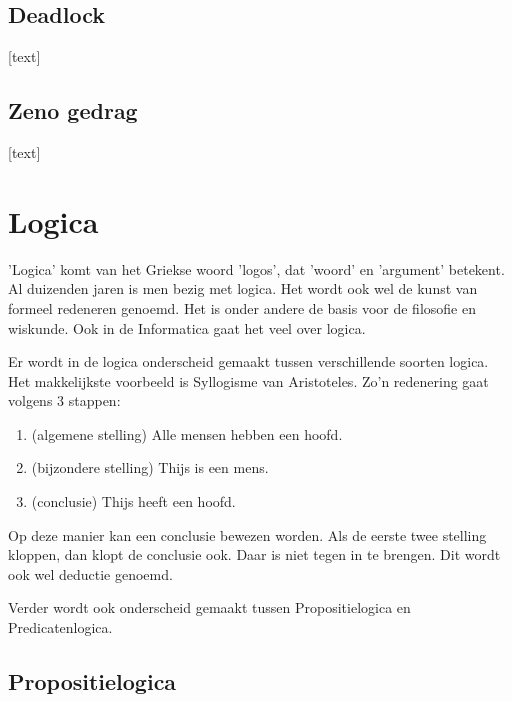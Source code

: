\documentclass{article}
\begin{document}
		\subsection{Deadlock}
		
		[text]
		
		\subsection{Zeno gedrag}
		
		[text]
		
	\newpage
	
	
	\section{Logica}
	
	'Logica' komt van het Griekse woord 'logos', dat 'woord' en 'argument' betekent. Al duizenden jaren is men bezig met logica. Het wordt ook wel de kunst van formeel redeneren genoemd. Het is onder andere de basis voor de filosofie en wiskunde. Ook in de Informatica gaat het veel over logica.

	Er wordt in de logica onderscheid gemaakt tussen verschillende soorten logica. Het makkelijkste voorbeeld is Syllogisme van Aristoteles. Zo'n redenering gaat volgens 3 stappen:

	\begin{enumerate}
		\item (algemene stelling) Alle mensen hebben een hoofd.
		\item (bijzondere stelling) Thijs is een mens.
		\item (conclusie) Thijs heeft een hoofd.
	\end{enumerate}

	Op deze manier kan een conclusie bewezen worden. Als de eerste twee stelling kloppen, dan klopt de conclusie ook. Daar is niet tegen in te brengen. Dit wordt ook wel deductie genoemd.

	Verder wordt ook onderscheid gemaakt tussen Propositielogica en Predicatenlogica.
	
		\subsection{Propositielogica}
		
\end{document}
